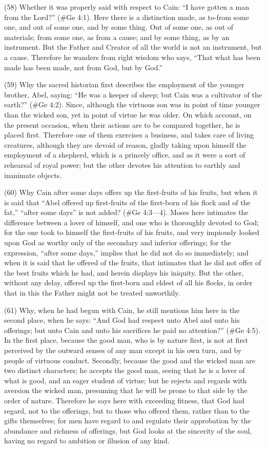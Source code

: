 (58) Whether it was properly said with respect to Cain: ``I have gotten a man from the Lord?''
(\#Ge 4:1). Here there is a distinction made, as to-from some one, and out of some one, and
by some thing. Out of some one, as out of materials; from some one, as from a cause; and by
some thing, as by an instrument. But the Father and Creator of all the world is not an instrument,
but a cause. Therefore he wanders from right wisdom who says, ``That what has been made has
been made, not from God, but by God.''

(59) Why the sacred historian first describes the employment of the younger brother, Abel, saying:
``He was a keeper of sheep; but Cain was a cultivator of the earth?'' (\#Ge 4:2). Since, although
the virtuous son was in point of time younger than the wicked son, yet in point of virtue he was
older. On which account, on the present occasion, when their actions are to be compared
together, he is placed first. Therefore one of them exercises a business, and takes care of living
creatures, although they are devoid of reason, gladly taking upon himself the employment of a
shepherd, which is a princely office, and as it were a sort of rehearsal of royal power; but the other
devotes his attention to earthly and inanimate objects.

(60) Why Cain after some days offers up the first-fruits of his fruits, but when it is said that ``Abel
offered up first-fruits of the first-born of his flock and of the fat,'' ``after some days'' is not added?
(\#Ge 4:3—4). Moses here intimates the difference between a lover of himself, and one who is
thoroughly devoted to God; for the one took to himself the first-fruits of his fruits, and very
impiously looked upon God as worthy only of the secondary and inferior offerings; for the
expression, ``after some days,'' implies that he did not do so immediately; and when it is said that he
offered of the fruits, that intimates that he did not offer of the best fruits which he had, and herein
displays his iniquity. But the other, without any delay, offered up the first-born and eldest of all his
flocks, in order that in this the Father might not be treated unworthily.

(61) Why, when he had begun with Cain, he still mentions him here in the second place, when he
says: ``And God had respect unto Abel and unto his offerings; but unto Cain and unto his sacrifices
he paid no attention?'' (\#Ge 4:5). In the first place, because the good man, who is by nature
first, is not at first perceived by the outward senses of any man except in his own turn, and by
people of virtuous conduct. Secondly, because the good and the wicked man are two distinct
characters; he accepts the good man, seeing that he is a lover of what is good, and an eager
student of virtue; but he rejects and regards with aversion the wicked man, presuming that he will
be prone to that side by the order of nature. Therefore he says here with exceeding fitness, that
God had regard, not to the offerings, but to those who offered them, rather than to the gifts
themselves; for men have regard to and regulate their approbation by the abundance and richness
of offerings, but God looks at the sincerity of the soul, having no regard to ambition or illusion of
any kind.


